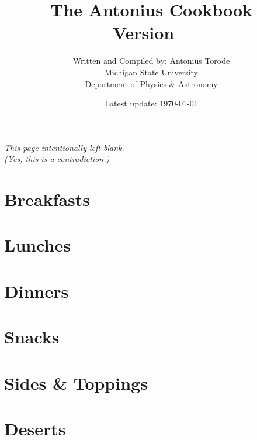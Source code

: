 \documentclass[a4paper,11pt]{book}
\title{{\huge \textbf{The Antonius Cookbook} \\ \textbf{Version -- \Version}} \\ \vspace{1cm}
}
\author{Written and Compiled by: Antonius Torode \\ Michigan State University \\ Department of Physics \& Astronomy}
\date{Latest update: \today}
\begin{document}
	
\AddToShipoutPicture*{\ChickenSalad}

\setlength{\parindent}{0pt}
\frontmatter
\clearpage
\maketitle

\tableofcontents
\newpage
\vspace*{\fill}
\begin{center}
	\textit{This page intentionally left blank. \\ (Yes, this is a contradiction.)}
\end{center}
\vspace*{\fill}

\mainmatter
\pagestyle{fancy}
\chapter{Breakfasts}

%
%

\chapter{Lunches}






\chapter{Dinners}






\chapter{Snacks}




\chapter{Sides \& Toppings}




\chapter{Deserts}




\backmatter
\end{document}

